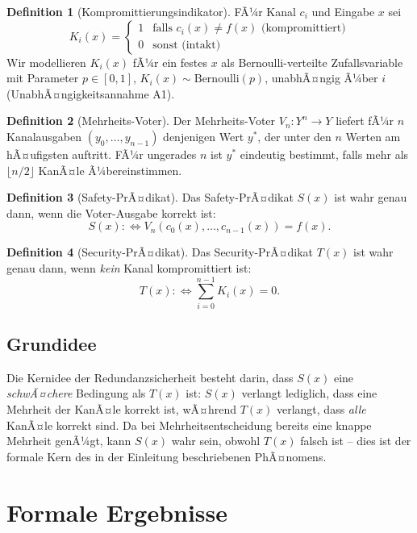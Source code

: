 ﻿\documentclass[a4paper,12pt]{article}
\theoremstyle{definition}
\newtheorem{definition}{Definition}
\begin{document}
\begin{definition}[Kompromittierungsindikator]
	FÃ¼r Kanal $c_i$ und Eingabe $x$ sei
	\[
	K_i(x) = \begin{cases}
		1 & \text{falls } c_i(x) \neq f(x) \text{ (kompromittiert)} \\
		0 & \text{sonst (intakt)}
	\end{cases}
	\]
	Wir modellieren $K_i(x)$ fÃ¼r ein festes $x$ als Bernoulli-verteilte Zufallsvariable mit Parameter $p \in [0,1]$, $K_i(x) \sim \mathrm{Bernoulli}(p)$, unabhÃ¤ngig Ã¼ber $i$ (UnabhÃ¤ngigkeitsannahme A1).
\end{definition}

\begin{definition}[Mehrheits-Voter]
	Der Mehrheits-Voter $V_n: Y^n \to Y$ liefert fÃ¼r $n$ Kanalausgaben $(y_0,\ldots,y_{n-1})$ denjenigen Wert $y^\ast$, der unter den $n$ Werten am hÃ¤ufigsten auftritt. FÃ¼r ungerades $n$ ist $y^\ast$ eindeutig bestimmt, falls mehr als $\lfloor n/2 \rfloor$ KanÃ¤le Ã¼bereinstimmen.
\end{definition}

\begin{definition}[Safety-PrÃ¤dikat]
	Das Safety-PrÃ¤dikat $S(x)$ ist wahr genau dann, wenn die Voter-Ausgabe korrekt ist:
	\[
	S(x) :\Leftrightarrow V_n(c_0(x),\ldots,c_{n-1}(x)) = f(x).
	\]
\end{definition}

\begin{definition}[Security-PrÃ¤dikat]
	Das Security-PrÃ¤dikat $T(x)$ ist wahr genau dann, wenn \emph{kein} Kanal kompromittiert ist:
	\[
	T(x) :\Leftrightarrow \sum_{i=0}^{n-1} K_i(x) = 0.
	\]
\end{definition}

\subsection{Grundidee}

Die Kernidee der Redundanzsicherheit besteht darin, dass $S(x)$ eine \emph{schwÃ¤chere} Bedingung als $T(x)$ ist: $S(x)$ verlangt lediglich, dass eine Mehrheit der KanÃ¤le korrekt ist, wÃ¤hrend $T(x)$ verlangt, dass \emph{alle} KanÃ¤le korrekt sind. Da bei Mehrheitsentscheidung bereits eine knappe Mehrheit genÃ¼gt, kann $S(x)$ wahr sein, obwohl $T(x)$ falsch ist -- dies ist der formale Kern des in der Einleitung beschriebenen PhÃ¤nomens.

\section{Formale Ergebnisse}
\end{document}
